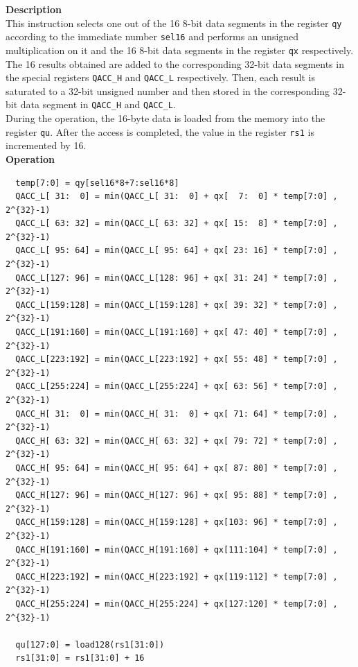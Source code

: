 \textbf{Description}\\
This instruction selects one out of the 16 8-bit data segments in the register \lstinline{qy} according to the immediate number \lstinline{sel16} and performs an unsigned multiplication on it and the 16 8-bit data segments in the register \lstinline{qx} respectively. The 16 results obtained are added to the corresponding 32-bit data segments in the special registers \lstinline{QACC_H} and \lstinline{QACC_L} respectively. Then, each result is saturated to a 32-bit unsigned number and then stored in the corresponding 32-bit data segment in \lstinline{QACC_H} and \lstinline{QACC_L}.\\
During the operation, the 16-byte data is loaded from the memory into the register \lstinline{qu}. After the access is completed, the value in the register \lstinline{rs1} is incremented by 16.\\
\textbf{Operation}
\begin{lstlisting}
  temp[7:0] = qy[sel16*8+7:sel16*8]
  QACC_L[ 31:  0] = min(QACC_L[ 31:  0] + qx[  7:  0] * temp[7:0] , 2^{32}-1)
  QACC_L[ 63: 32] = min(QACC_L[ 63: 32] + qx[ 15:  8] * temp[7:0] , 2^{32}-1)
  QACC_L[ 95: 64] = min(QACC_L[ 95: 64] + qx[ 23: 16] * temp[7:0] , 2^{32}-1)
  QACC_L[127: 96] = min(QACC_L[128: 96] + qx[ 31: 24] * temp[7:0] , 2^{32}-1)
  QACC_L[159:128] = min(QACC_L[159:128] + qx[ 39: 32] * temp[7:0] , 2^{32}-1)
  QACC_L[191:160] = min(QACC_L[191:160] + qx[ 47: 40] * temp[7:0] , 2^{32}-1)
  QACC_L[223:192] = min(QACC_L[223:192] + qx[ 55: 48] * temp[7:0] , 2^{32}-1)
  QACC_L[255:224] = min(QACC_L[255:224] + qx[ 63: 56] * temp[7:0] , 2^{32}-1)
  QACC_H[ 31:  0] = min(QACC_H[ 31:  0] + qx[ 71: 64] * temp[7:0] , 2^{32}-1)
  QACC_H[ 63: 32] = min(QACC_H[ 63: 32] + qx[ 79: 72] * temp[7:0] , 2^{32}-1)
  QACC_H[ 95: 64] = min(QACC_H[ 95: 64] + qx[ 87: 80] * temp[7:0] , 2^{32}-1)
  QACC_H[127: 96] = min(QACC_H[127: 96] + qx[ 95: 88] * temp[7:0] , 2^{32}-1)
  QACC_H[159:128] = min(QACC_H[159:128] + qx[103: 96] * temp[7:0] , 2^{32}-1)
  QACC_H[191:160] = min(QACC_H[191:160] + qx[111:104] * temp[7:0] , 2^{32}-1)
  QACC_H[223:192] = min(QACC_H[223:192] + qx[119:112] * temp[7:0] , 2^{32}-1)
  QACC_H[255:224] = min(QACC_H[255:224] + qx[127:120] * temp[7:0] , 2^{32}-1)

  qu[127:0] = load128(rs1[31:0])
  rs1[31:0] = rs1[31:0] + 16
\end{lstlisting}

